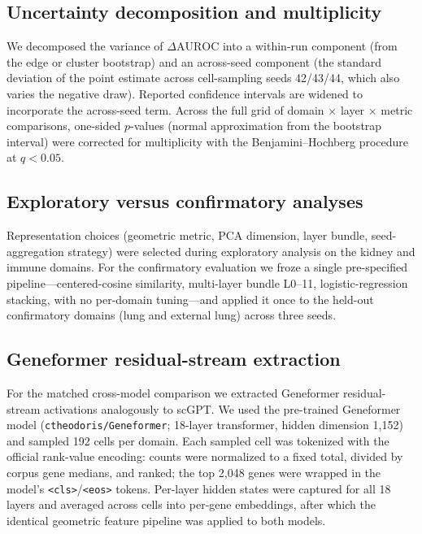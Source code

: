 \documentclass[11pt]{article}
\newcommand{\DAURC}{\Delta\mathrm{AUROC}}
\begin{document}
\subsection*{Uncertainty decomposition and multiplicity}

We decomposed the variance of $\DAURC$ into a within-run component (from the edge or cluster bootstrap) and an across-seed component (the standard deviation of the point estimate across cell-sampling seeds 42/43/44, which also varies the negative draw).
Reported confidence intervals are widened to incorporate the across-seed term.
Across the full grid of domain $\times$ layer $\times$ metric comparisons, one-sided $p$-values (normal approximation from the bootstrap interval) were corrected for multiplicity with the Benjamini--Hochberg procedure at $q < 0.05$.

\subsection*{Exploratory versus confirmatory analyses}

Representation choices (geometric metric, PCA dimension, layer bundle, seed-aggregation strategy) were selected during exploratory analysis on the kidney and immune domains.
For the confirmatory evaluation we froze a single pre-specified pipeline---centered-cosine similarity, multi-layer bundle L0--11, logistic-regression stacking, with no per-domain tuning---and applied it once to the held-out confirmatory domains (lung and external lung) across three seeds.

\subsection*{Geneformer residual-stream extraction}

For the matched cross-model comparison we extracted Geneformer residual-stream activations analogously to scGPT.
We used the pre-trained Geneformer model (\texttt{ctheodoris/Geneformer}; 18-layer transformer, hidden dimension 1{,}152) and sampled 192 cells per domain.
Each sampled cell was tokenized with the official rank-value encoding: counts were normalized to a fixed total, divided by corpus gene medians, and ranked; the top 2{,}048 genes were wrapped in the model's \texttt{<cls>}/\texttt{<eos>} tokens.
Per-layer hidden states were captured for all 18 layers and averaged across cells into per-gene embeddings, after which the identical geometric feature pipeline was applied to both models.
\end{document}
